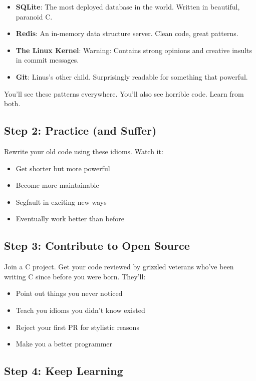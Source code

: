 \documentclass[10pt,openany]{book}
\begin{document}
\begin{itemize}
    \item \textbf{SQLite}: The most deployed database in the world. Written in beautiful, paranoid C.
    \item \textbf{Redis}: An in-memory data structure server. Clean code, great patterns.
    \item \textbf{The Linux Kernel}: Warning: Contains strong opinions and creative insults in commit messages.
    \item \textbf{Git}: Linus's other child. Surprisingly readable for something that powerful.
\end{itemize}

You'll see these patterns everywhere. You'll also see horrible code. Learn from both.

\subsection*{Step 2: Practice (and Suffer)}

Rewrite your old code using these idioms. Watch it:
\begin{itemize}
    \item Get shorter but more powerful
    \item Become more maintainable
    \item Segfault in exciting new ways
    \item Eventually work better than before
\end{itemize}

\subsection*{Step 3: Contribute to Open Source}

Join a C project. Get your code reviewed by grizzled veterans who've been writing C since before you were born. They'll:
\begin{itemize}
    \item Point out things you never noticed
    \item Teach you idioms you didn't know existed
    \item Reject your first PR for stylistic reasons
    \item Make you a better programmer
\end{itemize}

\subsection*{Step 4: Keep Learning}
\end{document}
